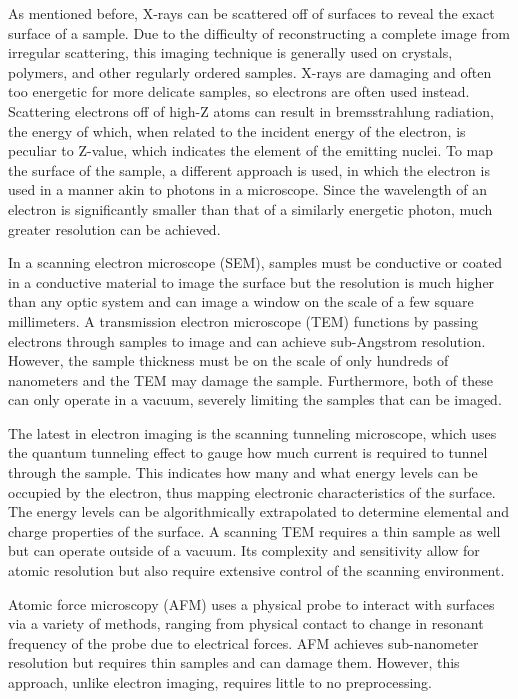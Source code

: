 As mentioned before, X-rays can be scattered off of surfaces to reveal the exact surface of a sample. Due to the difficulty of reconstructing a complete image from irregular scattering, this imaging technique is generally used on crystals, polymers, and other regularly ordered samples. X-rays are damaging and often too energetic for more delicate samples, so electrons are often used instead. Scattering electrons off of high-Z atoms can result in bremsstrahlung radiation, the energy of which, when related to the incident energy of the electron, is peculiar to Z-value, which indicates the element of the emitting nuclei. To map the surface of the sample, a different approach is used, in which the electron is used in a manner akin to photons in a microscope. Since the wavelength of an electron is significantly smaller than that of a similarly energetic photon, much greater resolution can be achieved.

In a scanning electron microscope (SEM), samples must be conductive or coated in a conductive material to image the surface but the resolution is much higher than any optic system and can image a window on the scale of a few square millimeters. A transmission electron microscope (TEM) functions by passing electrons through samples to image and can achieve sub-Angstrom resolution. However, the sample thickness must be on the scale of only hundreds of nanometers and the TEM may damage the sample. Furthermore, both of these can only operate in a vacuum, severely limiting the samples that can be imaged.

The latest in electron imaging is the scanning tunneling microscope, which uses the quantum tunneling effect to gauge how much current is required to tunnel through the sample. This indicates how many and what energy levels can be occupied by the electron, thus mapping electronic characteristics of the surface. The energy levels can be algorithmically extrapolated to determine elemental and charge properties of the surface. A scanning TEM requires a thin sample as well but can operate outside of a vacuum. Its complexity and sensitivity allow for atomic resolution but also require extensive control of the scanning environment.

Atomic force microscopy (AFM) uses a physical probe to interact with surfaces via a variety of methods, ranging from physical contact to change in resonant frequency of the probe due to electrical forces. AFM achieves sub-nanometer resolution but requires thin samples and can damage them. However, this approach, unlike electron imaging, requires little to no preprocessing.

